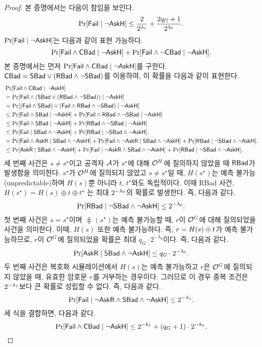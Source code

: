 \documentclass{article}
\theoremstyle{definition}
\begin{document}
\begin{proof}
	본 증명에서는 다음이 참임을 보인다.
	$$
		\Pr[\Fail \mid \neg\askH] \le  \frac{2}{2^{\sp_1}} + \frac{2\qr_{\gash} + 1}{2^{\sp_0}}.
	$$
	$\Pr[\Fail \mid \neg\askH]$는 다음과 같이 표현 가능하다.
	$$
		\Pr[\Fail \land \Cbad \mid \neg\askH]
		+ \Pr[\Fail \land \neg\Cbad \mid \neg\askH].
	$$
	본 증명에서는 먼저 $\Pr[\Fail \land \Cbad \mid \neg\askH]$를 구한다. $\Cbad
	= \Sbad \lor (\Rbad \land \neg\Sbad)$를 이용하여, 이 확률을 다음과 같이 표현한다.
	\begin{align*}
		&\Pr[\Fail \land \Cbad \mid \neg\askH] \\
		&= \Pr[\Fail \land (\Sbad \lor (\Rbad \land \neg\Sbad)) \mid \neg\askH] \\
		&= \Pr[(\Fail \land \Sbad) \lor (\Fail \land \Rbad \land \neg\Sbad) \mid \neg\askH] \\
		&\le \Pr[\Fail \land \Sbad \mid \neg\askH] + \Pr[\Fail \land \Rbad \land \neg\Sbad \mid \neg\askH] \\
		&\le \Pr[\Fail \land \Sbad \mid \neg\askH] + \Pr[\Rbad \land \neg\Sbad \mid \neg\askH] \\
		&\le \Pr[\Fail \mid \Sbad \land \neg\askH] + \Pr[\Rbad \mid \neg\Sbad \land \neg\askH]. \\
		&= \Pr[\Fail \land \askR \mid \Sbad \land \neg\askH] + \Pr[\Fail \land \neg\askR \mid \Sbad \land \neg\askH] + \Pr[\Rbad \mid \neg\Sbad \land \neg\askH]. \\
		&\le \Pr[\askR \mid \Sbad \land \neg\askH] + \Pr[\Fail \mid \neg\askR \land \Sbad \land \neg\askH] + \Pr[\Rbad \mid \neg\Sbad \land \neg\askH].
	\end{align*}
	세 번째 사건은 $s \ne s^\star$이고 공격자 $\adv$가 $s^\star$에 대해
	$\orc^{\hash}$에 질의하지 않았을 때 $\Rbad$가 발생함을 의미한다. $s^\star$가
	$\orc^H$에 질의되지 않았고 $s \ne s^\star$일 때, $H(s^\star)$는 예측
	불가능(unpredictable)하며 $H(s)$뿐 아니라 $t$, $t^\star$와도 독립적이다.
	이때 RBad 사건, $H(s^\star) = H(s) \oplus t \oplus t^\star$ 는 최대
	$2^{-\sp_0}$의 확률로 발생한다. 즉, 다음과 같다.
	$$
		\Pr[\Rbad \mid \neg\Sbad \land \neg\askH] \le 2^{-\sp_0}.
	$$
	첫 번째 사건은 $s = s^\star$이며 $\hash(s^\star)$는 예측 불가능할 때, $r$이
	$\orc^{\gash}$에 대해 질의되었을 사건을 의미한다. 이때, $H(s)$ 또한 예측
	불가능하다. 즉, $r = H(s) \xor t$가 예측 불가능하므로, $r$이 $\orc^G$에
	질의되었을 확률은 최대 $q_G \cdot 2^{-\lambda_0}$이다. 즉, 다음과 같다.
	$$
		\Pr[\askR \mid \Sbad \land \neg\askH] \le \qr_{\gash} \cdot 2^{-\sp_0}.
	$$
	두 번째 사건은 복호화 시뮬레이션에서 $H(s)$는 예측 불가능하고 $r$은 $\orc^G$에
	질의되지 않았을 때, 유효한 암호문 $\ct$를 거부하는 경우이다.  그러므로 이 경우 중복 조건은
	$2^{-\sp_1}$보다 큰 확률로 성립할 수 없다. 즉, 다음과 같다.
	$$
		\Pr[\Fail \mid \neg\askR \land \Sbad \land \neg\askH] \le 2^{-\sp_1}.
	$$
	세 식을 결합하면, 다음과 같다.
	$$
		\Pr[\Fail \land \Cbad \mid \neg\askH] \leq 2^{-k_1} + (q_G + 1) \cdot 2^{-k_0}.
	$$


\end{proof}
\end{document}
